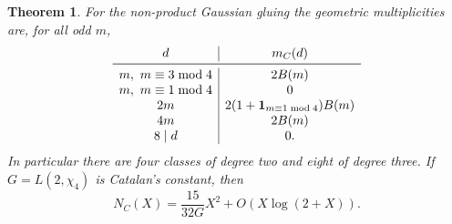 \documentclass[11pt,letterpaper]{amsart}
\newtheorem{theorem}{Theorem}[section]
\theoremstyle{definition}
\numberwithin{equation}{section}
\begin{document}
\begin{theorem}\label{thm:gauss}
For the non-product Gaussian gluing the geometric multiplicities
are, for all odd \(m\),
\[
\begin{array}{c|c}
 d & m_C(d)\\ \midrule
 m,\ m\equiv3\bmod4 & 2B(m)\\
 m,\ m\equiv1\bmod4 & 0\\
 2m & 2(1+\mathbf 1_{m\equiv1\bmod4})B(m)\\
 4m & 2B(m)\\
 8\mid d & 0 .
\end{array}
\]
In particular there are four classes of degree two and eight of
degree three. If \(G=L(2,\chi_4)\) is Catalan's constant, then
\begin{equation}\label{eq:gauss-asympt}
 N_C(X)=\frac{15}{32G}X^2+O(X\log(2+X)).
\end{equation}
\end{theorem}
\end{document}
